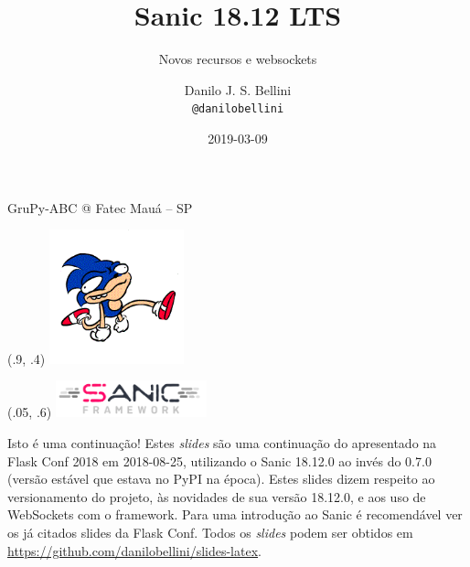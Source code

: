\documentclass[utf8]{beamer}
\title{Sanic 18.12 LTS}
\subtitle{Novos recursos e websockets}
\author{Danilo J. S. Bellini \\ \texttt{@danilobellini}}
\date{2019-03-09}
\begin{document}
\begin{frame}
  \titlepage
  \center GruPy-ABC @ Fatec Mauá -- SP
  \begin{textblock}{0}(.9, .4)%
    \includegraphics[height=110pt]{../2018-08-25_Sanic/sanic.png}%
  \end{textblock}
  \begin{textblock}{0}(.05, .6)%
    \includegraphics[height=30pt]{sanic-framework-logo-400x97.png}%
  \end{textblock}
\end{frame}


\begin{frame}{Isto é uma continuação!}
  Estes \emph{slides} são uma continuação
  do apresentado na Flask Conf 2018 em 2018-08-25,
  utilizando o Sanic 18.12.0 ao invés do 0.7.0
  (versão estável que estava no PyPI na época).
  \vfill
  Estes slides dizem respeito ao versionamento do projeto,
  às novidades de sua versão 18.12.0,
  e aos uso de WebSockets com o framework.
  Para uma introdução ao Sanic é recomendável
  ver os já citados slides da Flask Conf.
  \vfill
  Todos os \emph{slides} podem ser obtidos em
  \url{https://github.com/danilobellini/slides-latex}.
\end{frame}
\end{document}
